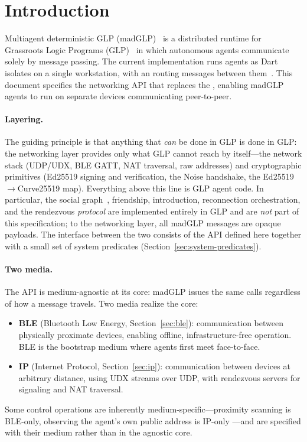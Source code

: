 \section{Introduction}
\label{sec:introduction}
Multiagent deterministic GLP (madGLP)~\cite{shapiro2026implementing} is a distributed runtime for Grassroots Logic Programs (GLP)~\cite{shapiro2025glp} in which autonomous agents communicate solely by message passing.  The current implementation runs agents as Dart isolates on a single workstation, with an  routing messages between them~\cite{shapiro2026implementing}.  This document specifies the networking API that replaces the , enabling madGLP agents to run on separate devices communicating peer-to-peer.

\paragraph{Layering.}
The guiding principle is that anything that \emph{can} be done in GLP is done in GLP: the networking layer provides only what GLP cannot reach by itself---the network stack (UDP/UDX, BLE GATT, NAT traversal, raw addresses) and cryptographic primitives (Ed25519 signing and verification, the Noise handshake, the Ed25519$\to$Curve25519 map).  Everything above this line is GLP agent code.  In particular, the social graph~\cite{shapiro2025atomic}, friendship, introduction, reconnection orchestration, and the rendezvous \emph{protocol} are implemented entirely in GLP and are \emph{not} part of this specification; to the networking layer, all madGLP messages are opaque payloads.  The interface between the two consists of the API defined here together with a small set of system predicates (Section~\ref{sec:system-predicates}).

\paragraph{Two media.}
The API is medium-agnostic at its core: madGLP issues the same calls regardless of how a message travels.  Two media realize the core:
\begin{itemize}
\item \textbf{BLE} (Bluetooth Low Energy, Section~\ref{sec:ble}): communication between physically proximate devices, enabling offline, infrastructure-free operation.  BLE is the bootstrap medium where agents first meet face-to-face.
\item \textbf{IP} (Internet Protocol, Section~\ref{sec:ip}): communication between devices at arbitrary distance, using UDX streams over UDP, with rendezvous servers for signaling and NAT traversal.
\end{itemize}
Some control operations are inherently medium-specific---proximity scanning is BLE-only, observing the agent's own public address is IP-only ---and are specified with their medium rather than in the agnostic core.

